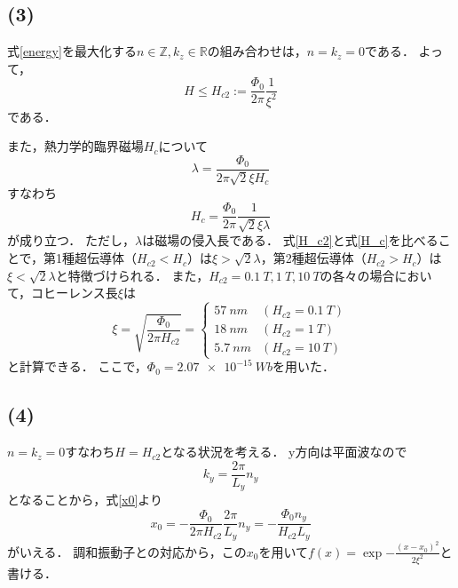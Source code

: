 \documentclass[a4paper,11pt]{jsarticle}
\begin{document}
\subsection*{(3)}
式\eqref{energy}を最大化する$n\in \mathbb{Z},k_z\in \mathbb{R}$の組み合わせは，$n=k_z=0$である．
よって，
\begin{equation}
  H \le H_{c2} := \frac{\Phi_0}{2\pi}\frac{1}{\xi^2} \label{H_c2}
\end{equation}
である．

また，熱力学的臨界磁場$H_c$について
\begin{equation}
  \lambda = \frac{\Phi_0}{2\pi\sqrt{2}\xi H_c}
\end{equation}
すなわち
\begin{equation}
  H_c = \frac{\Phi_0}{2\pi}\frac{1}{\sqrt{2}\xi\lambda} \label{H_c}
\end{equation}
が成り立つ．
ただし，$\lambda$は磁場の侵入長である．
式\eqref{H_c2}と式\eqref{H_c}を比べることで，第1種超伝導体（$H_{c2}<H_c$）は$\xi>\sqrt{2}\lambda$，第2種超伝導体（$H_{c2}>H_c$）は$\xi<\sqrt{2}\lambda$と特徴づけられる．
また，$H_{c2}=\SI{0.1}{T},\SI{1}{T},\SI{10}{T}$の各々の場合において，コヒーレンス長$\xi$は
\begin{equation}
  \xi = \sqrt{\frac{\Phi_0}{2\pi H_{c2}}} = 
  \begin{cases}
    \SI{57}{nm} & (H_{c2}=\SI{0.1}{T})\\
    \SI{18}{nm} & (H_{c2}=\SI{1}{T})\\
    \SI{5.7}{nm} & (H_{c2}=\SI{10}{T})
  \end{cases}
\end{equation}
と計算できる．
ここで，$\Phi_0=\SI{2.07e-15}{Wb}$を用いた．

\subsection*{(4)}
$n=k_z=0$すなわち$H=H_{c2}$となる状況を考える．
y方向は平面波なので
\begin{equation}
  k_y = \frac{2\pi}{L_y}n_y
\end{equation}
となることから，式\eqref{x0}より
\begin{equation}
  x_0 = -\frac{\Phi_0}{2\pi H_{c2}}\frac{2\pi}{L_y}n_y = -\frac{\Phi_0n_y}{ H_{c2}L_y}
\end{equation}
がいえる．
調和振動子との対応から，この$x_0$を用いて$f(x)=\exp{-\frac{(x-x_0)^2}{2\xi^2}}$と書ける．
\end{document}
